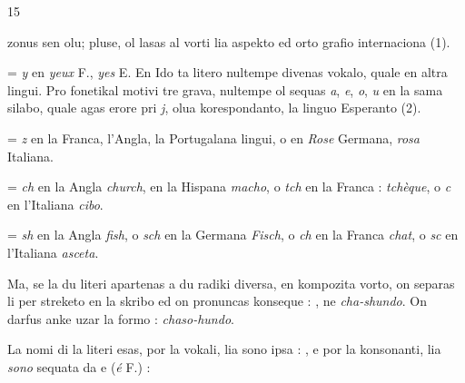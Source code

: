\begin{VUpage}[19]{15}

\VUcontinue zonus sen olu; pluse, ol lasas al vorti lia aspekto ed orto\cc
grafio internaciona (1).

\VUblancAlinea
{} = \textit{y} en \textit{yeux} F., \textit{yes} E. En Ido ta litero nultempe divenas\nl
vokalo, quale en altra lingui. Pro fonetikal motivi tre grava,\nl
nultempe ol sequas \textit{a}, \textit{e}, \textit{o}, \textit{u} en la sama silabo, quale agas\nl
erore pri \textit{j}, olua korespondanto, la linguo Esperanto (2).

\VUblanc{2.77pt}%
 = \textit{z} en la Franca, l'Angla, la Portugalana lingui, o  en\nl
\textit{Rose} Germana, \textit{rosa} Italiana.

\VUblancAlinea
{} = \textit{ch} en la Angla \textit{church}, en la Hispana \textit{macho}, o \textit{tch}\nl
en la Franca : \textit{tchèque}, o \textit{c} en l'Italiana \textit{cibo}.

\VUblancAlinea
{} = \textit{sh} en la Angla \textit{fish}, o \textit{sch} en la Germana \textit{Fisch}, o\nl
\textit{ch} en la Franca \textit{chat}, o \textit{sc} en l'Italiana \textit{asceta}.

\VUblancAlinea
Ma, se la du literi  apartenas a du radiki diversa, en\nl
kompozita vorto, on separas li per streketo en la skribo ed\nl
on pronuncas konseque : , ne \textit{cha-shundo}. On\nl
darfus anke uzar la formo : \textit{chaso-hundo}.

\VUblancAlinea
La nomi di la literi esas, por la vokali, lia sono ipsa :\nl
{}, e por la konsonanti, lia \textit{sono} sequata da e (\textit{é} F.) :\nl
{}


\end{VUpage}
